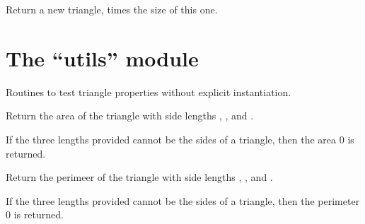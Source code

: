 \documentclass[letterpaper,10pt,english]{sphinxmanual}
\begin{document}
\begin{fulllineitems}
\begin{fulllineitems}
\end{fulllineitems}


\begin{fulllineitems}
\label{\detokenize{api:trianglelib.shape.Triangle.scale}}
Return a new triangle,  times the size of this one.

\end{fulllineitems}


\end{fulllineitems}



\section{The “utils” module}
\label{\detokenize{api:module-trianglelib.utils}}\label{\detokenize{api:the-utils-module}}
Routines to test triangle properties without explicit instantiation.

\begin{fulllineitems}
\label{\detokenize{api:trianglelib.utils.compute_area}}
Return the area of the triangle with side lengths , , and .

If the three lengths provided cannot be the sides of a triangle,
then the area 0 is returned.

\end{fulllineitems}


\begin{fulllineitems}
\label{\detokenize{api:trianglelib.utils.compute_perimeter}}
Return the perimeer of the triangle with side lengths , , and .

If the three lengths provided cannot be the sides of a triangle,
then the perimeter 0 is returned.

\end{fulllineitems}
\end{document}
